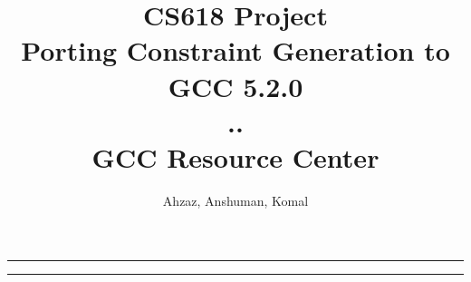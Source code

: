 \documentclass[a4paper]{article}
\author{Ahzaz, Anshuman, Komal}
\title{CS618 Project\\Porting Constraint Generation to GCC 5.2.0\\..\\ GCC Resource Center}
\begin{document}
\maketitle

\noindent
\rule{\textwidth}{2pt}%

\tableofcontents

\noindent
\rule{\textwidth}{2pt}%



%
%
\end{document}
